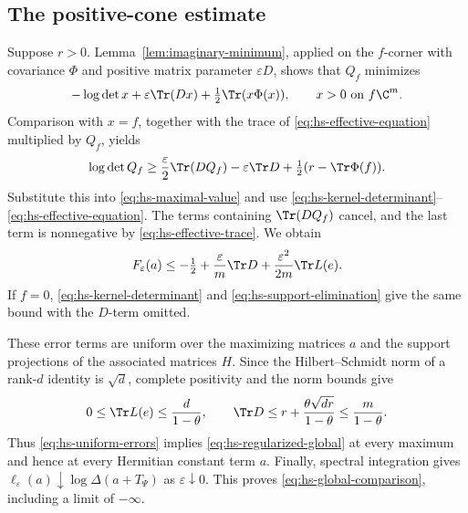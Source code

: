 \subsection{The positive-cone estimate}
Suppose $r>0$.
Lemma~\ref{lem:imaginary-minimum}, applied on the $f$-corner with covariance $\Phi$ and positive matrix parameter $\varepsilon D$, shows that $Q_f$ minimizes
\[
 -\log\det x+\varepsilon\Tr(Dx)+\tfrac12\Tr(x\Phi(x)),
 \qquad x>0\text{ on }f\C^m.
\]
Comparison with $x=f$, together with the trace of \eqref{eq:hs-effective-equation} multiplied by $Q_f$, yields
\[
 \log\det Q_f\ge\frac\varepsilon2\Tr(DQ_f)
       -\varepsilon\Tr D+\tfrac12(r-\Tr\Phi(f)).
\]
Substitute this into \eqref{eq:hs-maximal-value} and use \eqref{eq:hs-kernel-determinant}--\eqref{eq:hs-effective-equation}.
The terms containing $\Tr(DQ_f)$ cancel, and the last term is nonnegative by \eqref{eq:hs-effective-trace}.
We obtain
\begin{equation}\label{eq:hs-uniform-errors}
 F_\varepsilon(a)\le-\tfrac12+\frac\varepsilon m\Tr D
                          +\frac{\varepsilon^2}{2m}\Tr L(e).
\end{equation}
If $f=0$, \eqref{eq:hs-kernel-determinant} and \eqref{eq:hs-support-elimination} give the same bound with the $D$-term omitted.

These error terms are uniform over the maximizing matrices $a$ and the support projections of the associated matrices $H$.
Since the Hilbert--Schmidt norm of a rank-$d$ identity is $\sqrt d$, complete positivity and the norm bounds give
\[
 0\le\Tr L(e)\le\frac d{1-\theta},\qquad
 \Tr D\le r+\frac{\theta\sqrt{dr}}{1-\theta}
                  \le\frac m{1-\theta}.
\]
Thus \eqref{eq:hs-uniform-errors} implies \eqref{eq:hs-regularized-global} at every maximum and hence at every Hermitian constant term $a$.
Finally, spectral integration gives $\ell_\varepsilon(a)\downarrow\log\Delta(a+T_\Psi)$ as $\varepsilon\downarrow0$.
This proves \eqref{eq:hs-global-comparison}, including a limit of $-\infty$.
